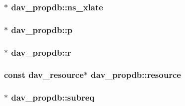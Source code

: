 \subsubsection[{\texorpdfstring{ns\+\_\+xlate}{ns_xlate}}]{$\ast$ dav\+\_\+propdb\+::ns\+\_\+xlate}\hypertarget{structdav__propdb_a346b1730a214b26be55c8ce1124ce16b}{}\label{structdav__propdb_a346b1730a214b26be55c8ce1124ce16b}
\subsubsection[{\texorpdfstring{p}{p}}]{$\ast$ dav\+\_\+propdb\+::p}\hypertarget{structdav__propdb_a6973ecc8f81aff87c31f924840e492b7}{}\label{structdav__propdb_a6973ecc8f81aff87c31f924840e492b7}
\subsubsection[{\texorpdfstring{r}{r}}]{$\ast$ dav\+\_\+propdb\+::r}\hypertarget{structdav__propdb_a72ed02c6c1e4c31ec9dba21e391aa455}{}\label{structdav__propdb_a72ed02c6c1e4c31ec9dba21e391aa455}
\subsubsection[{\texorpdfstring{resource}{resource}}]{\setlength{\rightskip}{0pt plus 5cm}const {\bf dav\+\_\+resource}$\ast$ dav\+\_\+propdb\+::resource}\hypertarget{structdav__propdb_ae1c59a594efb948fc6ba0a046ad336c1}{}\label{structdav__propdb_ae1c59a594efb948fc6ba0a046ad336c1}
\subsubsection[{\texorpdfstring{subreq}{subreq}}]{$\ast$ dav\+\_\+propdb\+::subreq}\hypertarget{structdav__propdb_a108cc520adb4f918650767354a355384}{}\label{structdav__propdb_a108cc520adb4f918650767354a355384}
